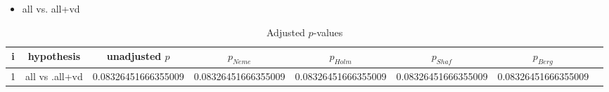 \documentclass[a4paper,10pt]{article}
\begin{document}
\begin{landscape}
\begin{itemize}


\item all vs. all+vd
\end{itemize}


\begin{table}[!htp]
\centering\tiny
\caption{Adjusted $p$-values}
\begin{tabular}{cccccccc}
i&hypothesis&unadjusted $p$&$p_{Neme}$&$p_{Holm}$&$p_{Shaf}$&$p_{Berg}$\\
\hline
1&all vs .all+vd&0.08326451666355009&0.08326451666355009&0.08326451666355009&0.08326451666355009&0.08326451666355009\\\hline
\end{tabular}
\end{table}

\end{landscape}
\end{document}

